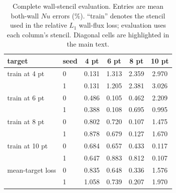 \documentclass[preprint,11pt,a4paper,times]{elsarticle}
\begin{document}
\begin{table}[htbp]
\centering
\footnotesize
\setlength{\tabcolsep}{5pt}
\caption{Complete wall-stencil evaluation. Entries are mean both-wall $Nu$ errors (\%).
``train'' denotes the stencil used in the relative $L_1$ wall-flux loss; evaluation uses each
column's stencil. Diagonal cells are highlighted in the main text.}
\label{tab:fullstencil}
\begin{tabular}{@{}llcccc@{}}
\toprule
target & seed & 4 pt & 6 pt & 8 pt & 10 pt\\
\midrule
train at 4 pt & 0 & 0.131 & 1.313 & 2.359 & 2.970\\
 & 1 & 0.131 & 1.205 & 2.381 & 3.026\\
train at 6 pt & 0 & 0.486 & 0.105 & 0.462 & 2.209\\
 & 1 & 0.388 & 0.108 & 0.695 & 0.995\\
train at 8 pt & 0 & 0.802 & 0.720 & 0.107 & 1.475\\
 & 1 & 0.878 & 0.679 & 0.127 & 1.670\\
train at 10 pt & 0 & 0.684 & 0.657 & 0.433 & 0.117\\
 & 1 & 0.647 & 0.883 & 0.812 & 0.107\\
\midrule
mean-target loss & 0 & 0.835 & 0.648 & 0.336 & 1.576\\
 & 1 & 1.058 & 0.739 & 0.207 & 1.970\\
\bottomrule
\end{tabular}
\end{table}
\end{document}
